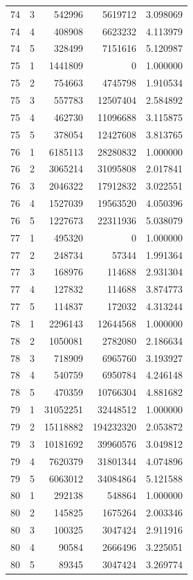 \begin{longtable}{rrrrr}
74 & 3 & 542996 & 5619712 & 3.098069 \\
74 & 4 & 408908 & 6623232 & 4.113979 \\
74 & 5 & 328499 & 7151616 & 5.120987 \\
75 & 1 & 1441809 & 0 & 1.000000 \\
75 & 2 & 754663 & 4745798 & 1.910534 \\
75 & 3 & 557783 & 12507404 & 2.584892 \\
75 & 4 & 462730 & 11096688 & 3.115875 \\
75 & 5 & 378054 & 12427608 & 3.813765 \\
76 & 1 & 6185113 & 28280832 & 1.000000 \\
76 & 2 & 3065214 & 31095808 & 2.017841 \\
76 & 3 & 2046322 & 17912832 & 3.022551 \\
76 & 4 & 1527039 & 19563520 & 4.050396 \\
76 & 5 & 1227673 & 22311936 & 5.038079 \\
77 & 1 & 495320 & 0 & 1.000000 \\
77 & 2 & 248734 & 57344 & 1.991364 \\
77 & 3 & 168976 & 114688 & 2.931304 \\
77 & 4 & 127832 & 114688 & 3.874773 \\
77 & 5 & 114837 & 172032 & 4.313244 \\
78 & 1 & 2296143 & 12644568 & 1.000000 \\
78 & 2 & 1050081 & 2782080 & 2.186634 \\
78 & 3 & 718909 & 6965760 & 3.193927 \\
78 & 4 & 540759 & 6950784 & 4.246148 \\
78 & 5 & 470359 & 10766304 & 4.881682 \\
79 & 1 & 31052251 & 32448512 & 1.000000 \\
79 & 2 & 15118882 & 194232320 & 2.053872 \\
79 & 3 & 10181692 & 39960576 & 3.049812 \\
79 & 4 & 7620379 & 31801344 & 4.074896 \\
79 & 5 & 6063012 & 34084864 & 5.121588 \\
80 & 1 & 292138 & 548864 & 1.000000 \\
80 & 2 & 145825 & 1675264 & 2.003346 \\
80 & 3 & 100325 & 3047424 & 2.911916 \\
80 & 4 & 90584 & 2666496 & 3.225051 \\
80 & 5 & 89345 & 3047424 & 3.269774 \\

\end{longtable}
